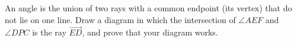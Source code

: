 An angle is the union of two rays with a common endpoint (its vertex) that do not lie on one line. Draw a diagram in which the intersection of $\angle AEF$ and $\angle DPC$ is the ray $\overrightarrow{ED}$, and prove that your diagram works.
